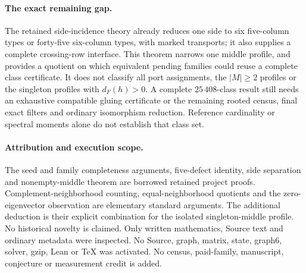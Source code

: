 \documentclass[11pt]{article}
\begin{document}
\paragraph{The exact remaining gap.}
The retained side-incidence theory already reduces one side to six
five-column types or forty-five six-column types, with marked transports;
it also supplies a complete crossing-row interface. This theorem narrows
one middle profile, and provides a quotient on which equivalent pending
families could reuse a complete class certificate. It does not classify
all port assignments, the $|M|\geq2$ profiles or the singleton profiles
with $d_F(h)>0$. A complete $25\,408$-class result still needs an exhaustive
compatible gluing certificate or the remaining rooted census, final exact
filters and ordinary isomorphism reduction. Reference cardinality or
spectral moments alone do not establish that class set.

\paragraph{Attribution and execution scope.}
The seed and family completeness arguments, five-defect identity, side
separation and nonempty-middle theorem are borrowed retained project
proofs. Complement-neighborhood counting, equal-neighborhood quotients and
the zero-eigenvector observation are elementary standard arguments.
The additional deduction is their explicit combination for the isolated
singleton-middle profile. No historical novelty is claimed. Only written
mathematics, Source text and ordinary metadata were inspected. No Source,
graph, matrix, state, graph6, solver, gzip, Lean or TeX was activated.
No census, paid-family, manuscript, conjecture or measurement credit is added.
\end{document}
